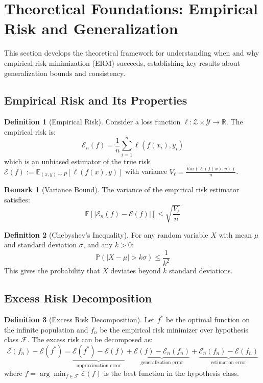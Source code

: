 \documentclass[12pt,a4paper]{article}
\theoremstyle{definition}
\newtheorem{definition}{Definition}[section]
\newtheorem{remark}{Remark}[section]
\begin{document}
\section{Theoretical Foundations: Empirical Risk and Generalization}

This section develops the theoretical framework for understanding when and why empirical risk minimization (ERM) succeeds, establishing key results about generalization bounds and consistency.

\subsection{Empirical Risk and Its Properties}

\begin{definition}[Empirical Risk]
Consider a loss function $\ell: \mathcal{Z} \times \mathcal{Y} \to \mathbb{R}$. The empirical risk is:
\[
\mathcal{E}_n(f) = \frac{1}{n} \sum_{i=1}^n \ell(f(x_i), y_i)
\]
which is an unbiased estimator of the true risk $\mathcal{E}(f) := \mathbb{E}_{(x,y) \sim P}[\ell(f(x),y)]$ with variance $V_\ell = \frac{\text{Var}(\ell(f(x),y))}{n}$.
\end{definition}

\begin{remark}[Variance Bound]
The variance of the empirical risk estimator satisfies:
\[
\mathbb{E}[|\mathcal{E}_n(f) - \mathcal{E}(f)|] \leq \sqrt{\frac{V_\ell}{n}}
\]
\end{remark}

\begin{definition}[Chebyshev's Inequality]
For any random variable $X$ with mean $\mu$ and standard deviation $\sigma$, and any $k > 0$:
\[
\mathbb{P}(|X - \mu| > k\sigma) \leq \frac{1}{k^2}
\]
This gives the probability that $X$ deviates beyond $k$ standard deviations.
\end{definition}

\subsection{Excess Risk Decomposition}

\begin{definition}[Excess Risk Decomposition]
Let $f^*$ be the optimal function on the infinite population and $f_n$ be the empirical risk minimizer over hypothesis class $\mathcal{F}$. The excess risk can be decomposed as:
\[
\mathcal{E}(f_n) - \mathcal{E}(f^*) = \underbrace{\mathcal{E}(f^*) - \mathcal{E}(f)}_{\text{approximation error}} + \underbrace{\mathcal{E}(f) - \mathcal{E}_n(f_n)}_{\text{generalization error}} + \underbrace{\mathcal{E}_n(f_n) - \mathcal{E}(f_n)}_{\text{estimation error}}
\]
where $f = \arg\min_{f \in \mathcal{F}} \mathcal{E}(f)$ is the best function in the hypothesis class.
\end{definition}
\end{document}
